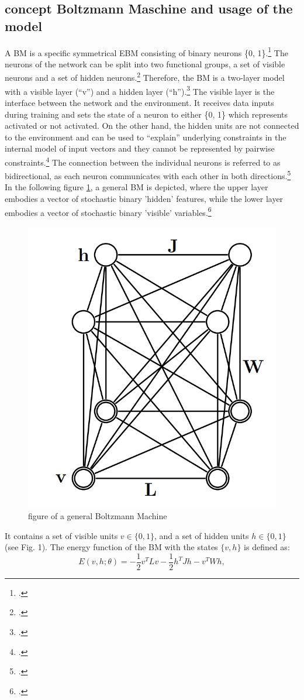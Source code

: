 \subsection{concept Boltzmann Maschine and usage of the model}

A \ac{BM} is a specific symmetrical \ac{EBM} consisting of binary neurons \{0, 1\}.\footcite[Vgl.][260]{amariInformationGeometryBoltzmann1992}
The neurons of the network can be split into two functional groups, a set of visible neurons and a set of hidden neurons.\footcite[Vgl.][154]{ackleyLearningAlgorithmBoltzmann1985}
Therefore, the \ac{BM} is a two-layer model with a visible layer (``v'') and a hidden layer (``h'').\footcite[Vgl.][448]{salakhutdinovDeepBoltzmannMachines2009}
The visible layer is the interface between the network and the environment. It receives data inputs during training and sets the state of a neuron to either \{0, 1\} which represents activated or not activated.
On the other hand, the hidden units are not connected to the environment and can be used to “explain” underlying constraints in the internal model of input vectors and they cannot be represented by pairwise constraints.\footcite[Vgl.][154]{ackleyLearningAlgorithmBoltzmann1985}
The connection between the individual neurons is referred to as bidirectional, as each neuron communicates with each other in both directions.\footcite[Vgl.][149]{ackleyLearningAlgorithmBoltzmann1985}
In the following figure \ref{fig1}, a general \ac{BM} is depicted, where the upper layer embodies a vector of stochastic binary 'hidden' features, while the lower layer embodies a vector of stochastic binary 'visible' variables.\footcite[Vgl.][449]{salakhutdinovDeepBoltzmannMachines2009}

\begin{figure}[H]
    \centering
    \includegraphics[width=0.25\linewidth]{graphics/General_BM.png}
    \caption{figure of a general Boltzmann Machine}
    \label{fig1}
\end{figure}
It contains a set of visible units \( v \in \{0, 1\} \), and a set of hidden units \( h \in \{0, 1\} \) (see Fig. 1). The energy function of the \ac{BM} with the states \( \{v, h\} \) is defined as:
\begin{equation}
E(v, h; \theta) = -\frac{1}{2} v^T L v - \frac{1}{2} h^T J h - v^T W h,
\end{equation}

